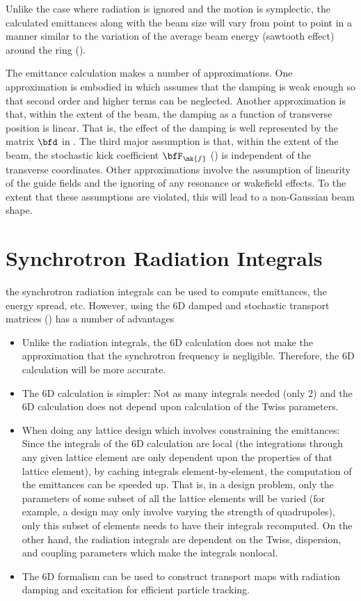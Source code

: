 Unlike the case where radiation is ignored and the motion is symplectic, the calculated emittances
along with the beam size will vary from point to point in a manner similar to the variation of the average
beam energy (sawtooth effect) around the ring ().

The emittance calculation makes a number of approximations. One approximation is embodied in
 which assumes that the damping is weak enough so that second order and higher terms can be
neglected. Another approximation is that, within the extent of the beam, the damping as a function
of transverse position is linear. That is, the effect of the damping is well represented by the
matrix $\bfd$ in . The third major assumption is that, within the extent of the beam, the
stochastic kick coefficient $\bfF_\mk{f}$ () is independent of the transverse coordinates.
Other approximations involve the assumption of linearity of the guide fields and the ignoring of any
resonance or wakefield effects. To the extent that these assumptions are violated, this will lead to
a non-Gaussian beam shape.

\section{Synchrotron Radiation Integrals}
\label{s:synch.ints}

the synchrotron radiation integrals can be used to compute emittances, the energy spread,
etc. However, using the 6D damped and stochastic transport matrices () has
a number of advantages
\begin{itemize}
%
\item
Unlike the radiation integrals, the 6D calculation does not make the approximation that the
synchrotron frequency is negligible. Therefore, the 6D calculation will be more accurate.
%
\item
The 6D calculation is simpler: Not as many integrals needed (only 2) and the 6D calculation does not
depend upon calculation of the Twiss parameters.
%
\item
When doing any lattice design which involves constraining the emittances: Since the integrals of the
6D calculation are local (the integrations through any given lattice element are only dependent upon
the properties of that lattice element), by caching integrals element-by-element, the computation of
the emittances can be speeded up. That is, in a design problem, only the parameters of some subset
of all the lattice elements will be varied (for example, a design may only involve varying the
strength of quadrupoles), only this subset of elements needs to have their integrals recomputed.  On
the other hand, the radiation integrals are dependent on the Twiss, dispersion, and coupling
parameters which make the integrals nonlocal.
%
\item
The 6D formalism can be used to construct transport maps with radiation damping and excitation for
efficient particle tracking.
\end{itemize}

